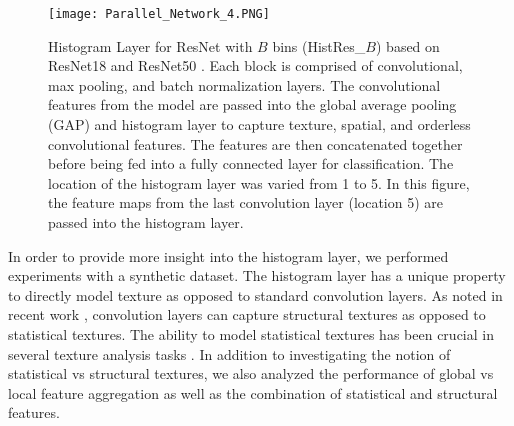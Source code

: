\documentclass[journal]{IEEEtai}
\begin{document}
		\begin{figure*}[t]
		\begin{center}
			\texttt{[image: Parallel\_Network\_4.PNG]}
		\end{center}
		\caption{Histogram Layer for ResNet with $B$ bins (HistRes\_$B$) based on ResNet18 and ResNet50 \cite{he2016deep}. Each block is comprised of convolutional, max pooling, and batch normalization layers. The convolutional features from the model are passed into the global average pooling (GAP) and histogram layer to capture texture, spatial, and orderless convolutional features. The features are then concatenated together before being fed into a fully connected layer for classification. The location of the histogram layer was varied from 1 to 5. In this figure, the feature maps from the last convolution layer (location 5) are passed into the histogram layer.}
		\label{fig:HistNet}
	\end{figure*}
	In order to provide more insight into the histogram layer, we performed experiments with a synthetic dataset. The histogram layer has a unique property to directly model texture as opposed to standard convolution layers. As noted in recent work {\cite{zhu2021learning}}, convolution layers can capture structural textures as opposed to statistical textures. The ability to model statistical textures has been crucial in several texture analysis tasks \mbox{\cite{haralick1973textural,liu2019texture,humeau2019texture}}. In addition to investigating the notion of statistical vs structural textures, we also analyzed the performance of global vs local feature aggregation as well as the combination of statistical and structural features.
	
\end{document}
